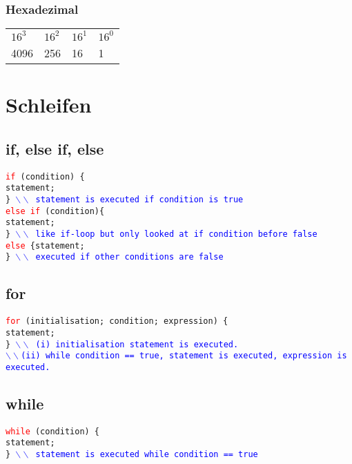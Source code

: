 \documentclass[a3paper, 10pt, landscape]{scrartcl}
\newcommand{\code}[1]{\texttt{#1}}
\begin{document}
\begin{multicols*}{3}
		\subsubsection{Hexadezimal}
        \begin{tabular}{l l l l}
        $16^{3}$ & $16^2$ & $16^1$ & $16^0$ \\
        4096 & 256 & 16 & 1
        \end{tabular}

	
\section{Schleifen}
	
	\subsection{if, else if, else}
	\code{\textcolor{red}{if} (condition) \{ \\
	\phantom{if} statement; \\
	\} 
	\textcolor{blue} {$\backslash \backslash$ statement is executed if condition is true} \\
	\newline
	\textcolor{red}{else if} (condition)\{ \\
	\phantom{else if} statement; \\
	\} \textcolor{blue} {$\backslash \backslash$ like if-loop but only looked at if condition before false} \\
	\newline
	\textcolor{red}{else} \{statement; \\
	\} \textcolor{blue}{$\backslash \backslash$ executed if other conditions are false }
	}
	\subsection{for}
	\code{\textcolor{red}{for} (initialisation; condition; expression) \{ \\
	\phantom{for} statement; \\
	\} \textcolor{blue}{$\backslash \backslash$ (i) initialisation statement is executed. \\
	\phantom{) } $\backslash \backslash$(ii) while condition == true, statement is executed, expression is executed. }
	}
	\subsection{while}
	\code{\textcolor{red}{while} (condition) \{ \\
	\phantom{while} statement; \\
	\} \textcolor{blue}{$\backslash \backslash$ statement is executed while condition == true}
	}

\end{multicols*}
\end{document}
